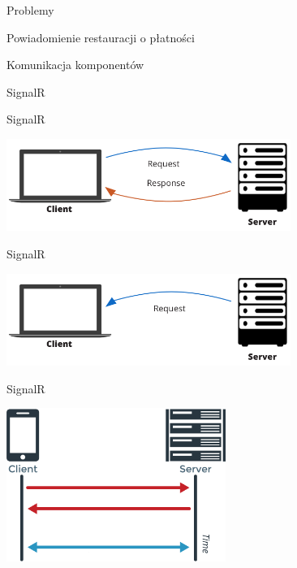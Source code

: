 \documentclass{beamer}
\begin{document}
\begin{frame}{Problemy}
	\begin{center}
		\Huge{Powiadomienie restauracji o płatności}
	\end{center}
\end{frame}

\begin{frame}{Komunikacja komponentów}
	\begin{center}
		\Huge{SignalR}
	\end{center}
\end{frame}

\begin{frame}{SignalR}
	\begin{center}
		\includegraphics[height=3cm]{prosta_komunikacja2.png}
	\end{center}
\end{frame}

\begin{frame}{SignalR}
	\begin{center}
		\includegraphics[height=3cm]{signalr1.png}
	\end{center}
\end{frame}

\begin{frame}{SignalR}
	\begin{center}
		\includegraphics[height=5cm]{websocket1.png}
	\end{center}
\end{frame}
\end{document}
